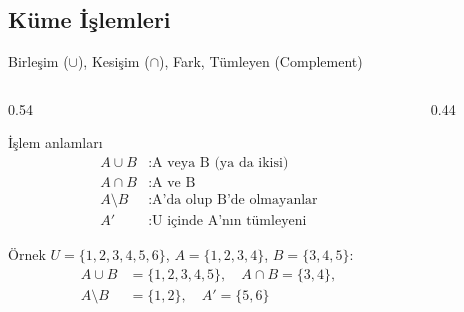 \documentclass[light]{lutbeamer}
\begin{document}
\subsection{Küme İşlemleri}
\begin{frame}[fragile]{Birleşim ($\cup$), Kesişim ($\cap$), Fark, Tümleyen (Complement)}
    \scriptsize
    \begin{columns}[T]
        \begin{column}{0.54\textwidth}
            \begin{block}{İşlem anlamları}
                \[
                    \begin{aligned}
                        A\cup B &: \text{A veya B (ya da ikisi)}\\
                        A\cap B &: \text{A ve B}\\
                        A\setminus B &: \text{A'da olup B'de olmayanlar}\\
                        A' &: \text{U içinde A'nın tümleyeni}
                    \end{aligned}
                \]
            \end{block}

            \begin{exampleblock}{Örnek}
                $U=\{1,2,3,4,5,6\}$, $A=\{1,2,3,4\}$, $B=\{3,4,5\}$:
                \[
                    \begin{aligned}
                        A\cup B&=\{1,2,3,4,5\},\quad A\cap B=\{3,4\},\\
                        A\setminus B&=\{1,2\},\quad A'=\{5,6\}
                    \end{aligned}
                \]
            \end{exampleblock}
        \end{column}
        \begin{column}{0.44\textwidth}
            \centering
        \end{column}
    \end{columns}
\end{frame}
\end{document}
